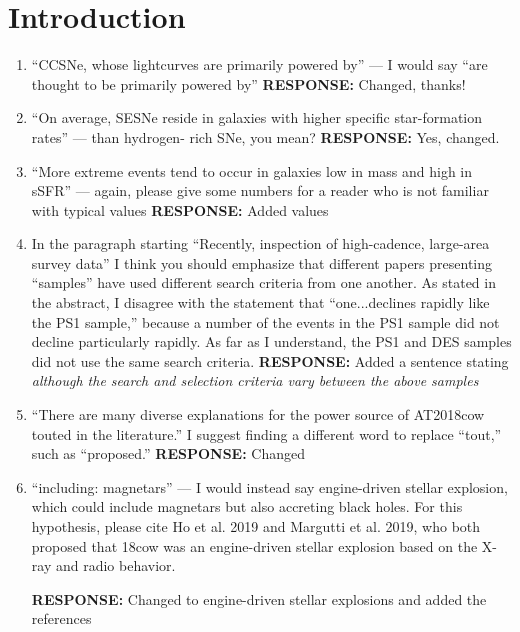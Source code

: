 \documentclass{article}
\begin{document}
\section*{Introduction}
\begin{enumerate}

\item “CCSNe, whose lightcurves are primarily powered by” — I would say “are thought to be primarily powered by”
\vskip0.1cm
{\bf RESPONSE: } Changed, thanks!

\item “On average, SESNe reside in galaxies with higher specific star-formation rates” — than hydrogen- rich SNe, you mean?
\vskip0.1cm
{\bf RESPONSE: } Yes, changed.

\item “More extreme events tend to occur in galaxies low in mass and high in sSFR” — again, please give some numbers for a reader who is not familiar with typical values
\vskip0.1cm
{\bf RESPONSE: } Added values

\item In the paragraph starting “Recently, inspection of high-cadence, large-area survey data” I think you should emphasize that different papers presenting “samples” have used different search criteria from one another. As stated in the abstract, I disagree with the statement that “one...declines rapidly like the PS1 sample,” because a number of the events in the PS1 sample did not decline particularly rapidly. As far as I understand, the PS1 and DES samples did not use the same search criteria.
\vskip0.1cm
{\bf RESPONSE: } Added a sentence stating \textit{although the search and selection criteria vary between the above samples}

\item “There are many diverse explanations for the power source of AT2018cow touted in the literature.” I suggest finding a different word to replace “tout,” such as “proposed.”
\vskip0.1cm
{\bf RESPONSE: } Changed

\item “including: magnetars” — I would instead say engine-driven stellar explosion, which could include magnetars but also accreting black holes. For this hypothesis, please cite Ho et al. 2019 and Margutti et al. 2019, who both proposed that 18cow was an engine-driven stellar explosion based on the X-ray and radio behavior.

\vskip0.1cm
{\bf RESPONSE: } Changed to engine-driven stellar explosions and added the references


\end{enumerate}
\end{document}

